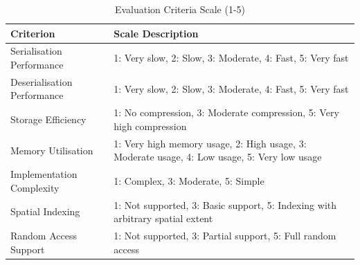 
\begin{table}[htbp]
  \caption{Evaluation Criteria Scale (1-5)}
  \label{tab:criteria-scale}
  \begin{tabular}{p{3cm}|p{12cm}}
    \hline
    \textbf{Criterion} & \textbf{Scale Description} \\
    \hline
    Serialisation Performance & 1: Very slow, 2: Slow, 3: Moderate, 4: Fast, 5: Very fast \\
    \hline
    Deserialisation Performance & 1: Very slow, 2: Slow, 3: Moderate, 4: Fast, 5: Very fast \\
    \hline
    Storage Efficiency & 1: No compression, 3: Moderate compression, 5: Very high compression \\
    \hline
    Memory Utilisation & 1: Very high memory usage, 2: High usage, 3: Moderate usage, 4: Low usage, 5: Very low usage \\
    \hline
    Implementation Complexity & 1: Complex, 3: Moderate, 5: Simple \\
    \hline
    Spatial Indexing & 1: Not supported, 3: Basic support, 5: Indexing with arbitrary spatial extent \\
    \hline
    Random Access Support & 1: Not supported, 3: Partial support, 5: Full random access \\
    \hline
  \end{tabular}
\end{table}